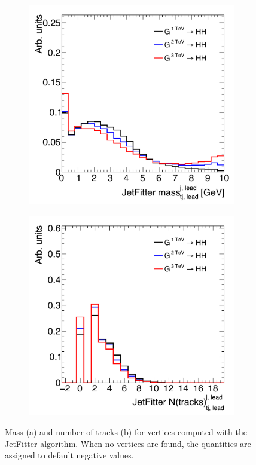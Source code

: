 \begin{figure}[h!]
   \begin{subfigure}[t]{0.5\textwidth}
        \centering
        \includegraphics[width=\textwidth]{figures/LeadTrackJet_JFmass}
        \caption{}
    \end{subfigure}%
    \begin{subfigure}[t]{0.5\textwidth}
        \centering
        \includegraphics[width=\textwidth]{figures/LeadTrackJet_JFntrk}
        \caption{}
    \end{subfigure}

   \caption{Mass (a) and number of tracks (b) for vertices computed with the JetFitter algorithm. When no vertices are found, the quantities are assigned to default negative values.}
  \label{fig:TrackJetJF}
\end{figure}

